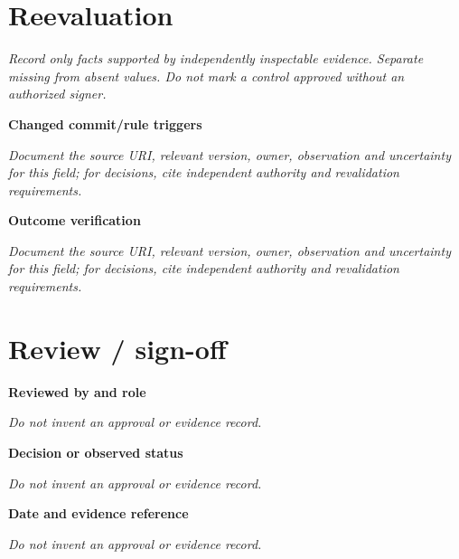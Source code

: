 \documentclass[11pt,letterpaper]{article}
\begin{document}
\section{Reevaluation}
\noindent\emph{Record only facts supported by independently inspectable evidence. Separate missing from absent values. Do not mark a control approved without an authorized signer.}\par
\noindent\textbf{Changed commit/rule triggers}\par
\noindent\emph{Document the source URI, relevant version, owner, observation and uncertainty for this field; for decisions, cite independent authority and revalidation requirements.}\par\medskip
\noindent\textbf{Outcome verification}\par
\noindent\emph{Document the source URI, relevant version, owner, observation and uncertainty for this field; for decisions, cite independent authority and revalidation requirements.}\par\medskip
\section{Review / sign-off}
\noindent\textbf{Reviewed by and role}\par
\emph{Do not invent an approval or evidence record.}\par\medskip
\noindent\textbf{Decision or observed status}\par
\emph{Do not invent an approval or evidence record.}\par\medskip
\noindent\textbf{Date and evidence reference}\par
\emph{Do not invent an approval or evidence record.}\par\medskip
\end{document}
